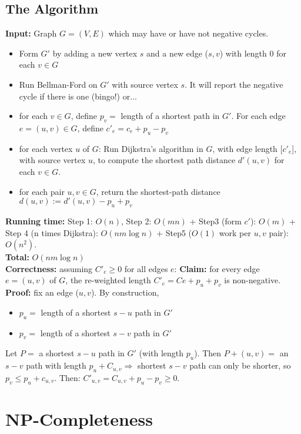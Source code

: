 \documentclass{scrartcl}
\begin{document}
\subsection{The Algorithm}
\label{sec:15-5}
{\bf Input: } Graph $G = (V, E)$ which may have or have not negative cycles. 
\begin{itemize}
\item Form $G'$ by adding a new vertex $s$ and a new edge ($s, v$) with length 0
  for each $v \in G$
\item Run Bellman-Ford on $G'$ with source vertex $s$. It will report the
  negative cycle if there is one (bingo!) or...
\item for each $v \in G$, define $p_v = $ length of a shortest path in $G'$. For
  each edge $e = (u, v) \in G$, define $c'_e = c_e + p_u - p_v$
\item for each vertex $u$ of $G$: Run Dijkstra's algorithm in $G$, with edge
  length [$c'_e$], with source vertex $u$, to compute the shortest path distance
  $d'(u, v)$ for each $v \in G$.
\item for each pair $u, v \in G$, return the shortest-path distance $d(u,v) :=
  d'(u,v) - p_u + p_v$
\end{itemize} {\bf Running time: } Step 1: $O(n)$, Step 2: $O(mn)$ + Step3 (form
$c'$): $O(m)$ + Step 4 (n times Dijkstra): $O(nm \log n)$ + Step5 ($O(1)$ work
per $u, v$ pair): $O(n^2)$.\\
{\bf Total: } $O(nm \log n)$\\
{\bf Correctness: } assuming $C'_e \geq 0$ for all edges $e$:
{\bf Claim: } for every edge $e = (u, v)$ of $G$, the re-weighted length $C'_e =
Ce + p_u + p_v$ is non-negative.\\
{\bf Proof: } fix an edge ($u, v$). By construction, 
\begin{itemize}
\item $p_u = $ length of a shortest $s-u$ path in $G'$
\item $p_v = $ length of a shortest $s-v$ path in $G'$
\end{itemize}
Let $P = $ a shortest $s-u$ path in $G'$ (with length $p_u$). Then $P + (u, v) =
$ an $s-v$ path with length $p_u + C_{u, v} \Rightarrow$ shortest $s-v$ path can
only be shorter, so $p_v \leq  p_u + c_{u,v}$. Then: $C'_{u,v} = C_{u,v} + p_u-
p_v \geq 0$.

\section{NP-Completeness}
\label{sec:16-0}
\end{document}
